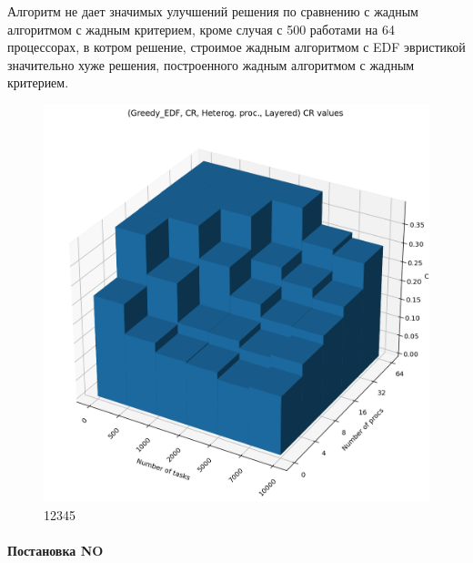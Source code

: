 Алгоритм не дает значимых улучшений решения по сравнению с жадным алгоритмом с жадным критерием, кроме случая с 500 работами на 64 процессорах, в котром решение, строимое жадным алгоритмом с EDF эвристикой значительно хуже решения, построенного жадным алгоритмом с жадным критерием.

\begin{figure}[!htbp]
    \centering
    \includegraphics[width=\textwidth]{imgs/unbalanced/CR_EDF/cr_3d.png}
    \caption{12345}
\end{figure}

\paragraph{Постановка NO}

